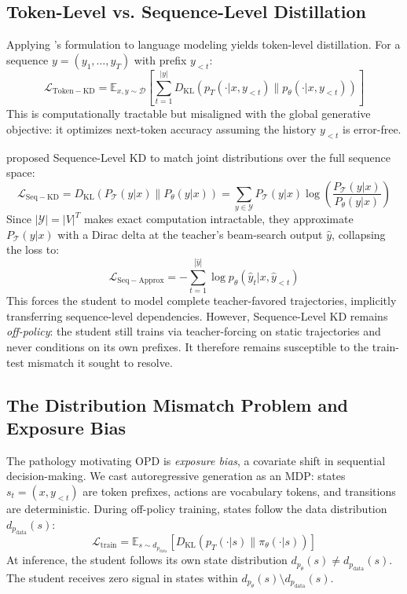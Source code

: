 \documentclass{article} %
\newcommand{\KL}{D_{\mathrm{KL}}}
\newcommand{\ptheta}{p_\theta}
\newcommand{\pteacher}{p_T}
\newcommand{\pdata}{p_{\mathrm{data}}}
\newcommand{\loss}{\mathcal{L}}
\begin{document}
\subsection{Token-Level vs. Sequence-Level Distillation}
\label{subsec:token_vs_sequence}

Applying \citet{hinton2015distilling}'s formulation to language modeling yields token-level distillation. For a sequence $y = (y_1, \dots, y_T)$ with prefix $y_{<t}$:
\begin{equation}
    \loss_{\mathrm{Token-KD}} = \mathbb{E}_{x, y \sim \mathcal{D}} \left[ \sum_{t=1}^{|y|} \KL(\pteacher(\cdot | x, y_{<t}) \parallel \ptheta(\cdot | x, y_{<t})) \right]
\end{equation}
This is computationally tractable but misaligned with the global generative objective: it optimizes next-token accuracy assuming the history $y_{<t}$ is error-free.

\citet{kim2016sequence} proposed Sequence-Level KD to match joint distributions over the full sequence space:
\begin{equation}
    \loss_{\mathrm{Seq-KD}} = \KL(P_{\mathcal{T}}(y | x) \parallel P_{\theta}(y | x)) = \sum_{y \in \mathcal{Y}} P_{\mathcal{T}}(y | x) \log \left( \frac{P_{\mathcal{T}}(y | x)}{P_{\theta}(y | x)} \right)
\end{equation}
Since $|\mathcal{Y}| = |V|^T$ makes exact computation intractable, they approximate $P_{\mathcal{T}}(y|x)$ with a Dirac delta at the teacher's beam-search output $\hat{y}$, collapsing the loss to:
\begin{equation}
    \loss_{\mathrm{Seq-Approx}} = - \sum_{t=1}^{|\hat{y}|} \log \ptheta(\hat{y}_t | x, \hat{y}_{<t})
\end{equation}
This forces the student to model complete teacher-favored trajectories, implicitly transferring sequence-level dependencies. However, Sequence-Level KD remains \textit{off-policy}: the student still trains via teacher-forcing on static trajectories and never conditions on its own prefixes. It therefore remains susceptible to the train-test mismatch it sought to resolve.

\subsection{The Distribution Mismatch Problem and Exposure Bias}
\label{subsec:exposure_bias}

The pathology motivating OPD is \textit{exposure bias}, a covariate shift in sequential decision-making. We cast autoregressive generation as an MDP: states $s_t = (x, y_{<t})$ are token prefixes, actions are vocabulary tokens, and transitions are deterministic. During off-policy training, states follow the data distribution $d_{\pdata}(s)$:
\begin{equation}
    \loss_{\mathrm{train}} = \mathbb{E}_{s \sim d_{\pdata}} \left[ \KL(\pteacher(\cdot|s) \parallel \pi_\theta(\cdot|s)) \right]
\end{equation}
At inference, the student follows its own state distribution $d_{\ptheta}(s) \neq d_{\pdata}(s)$. The student receives zero signal in states within $d_{\ptheta}(s) \setminus d_{\pdata}(s)$.
\end{document}
